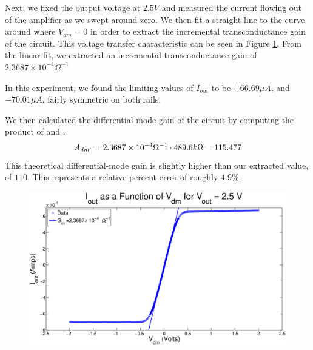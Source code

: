 Next, we fixed the output voltage at $2.5V$ and measured the current flowing
out of the amplifier as we swept \Vdm around zero. We then fit a straight line
to the curve around where $V_{dm} = 0$ in order to extract the incremental
transconductance gain of the circuit.  This voltage transfer characteristic 
can be seen in Figure \ref{fig:exp2p3}.
From the linear fit, we extracted an incremental transconductance gain of $2.3687 \times 10^{-4} \Omega^{-1}$

In this experiment, we found the limiting values of $I_{out}$ to be $+ 66.69 \mu A$, and $-70.01 \mu A$, fairly symmetric on both rails. 

We then calculated the differential-mode gain of the circuit by computing
the product of \Gm and \Ro.
$$A_{dm`} =  2.3687 \times 10^{-4} \Omega^{-1} \cdot 489.6k\Omega = 115.477$$
This theoretical differential-mode gain is slightly higher than our extracted
value, of $110$. This represents a relative percent error of roughly $4.9\%$.


\begin{figure}[H]
\centering
\includegraphics[width=\linewidth]{../Figures/Exp2P3.eps}
\caption{}
\label{fig:exp2p3}
\end{figure}